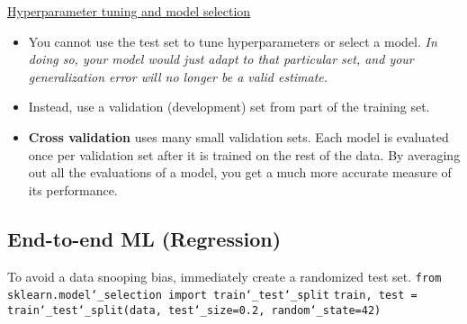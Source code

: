 \vspace{+3.0mm}
\underline{Hyperparameter tuning and model selection}
\begin{itemize}
\vspace{-3.0mm}
\item
You cannot use the test set to tune hyperparameters or select a model.\newline
\textit{In doing so, your model would just adapt to that particular set,
and your generalization error will no longer be a valid estimate.}
\item
Instead, use a validation (development) set from part of the training set.
\item
\textbf{Cross validation} uses many small validation sets.
Each model is evaluated once per validation set after it is trained on the rest of the data.
By averaging out all the evaluations of a model,
you get a much more accurate measure of its performance.
\end{itemize}

\newpage
\subsection{End-to-end ML (Regression)}

To avoid a data snooping bias, immediately create a randomized test set.\newline
\texttt{from sklearn.model\char`_selection import train\char`_test\char`_split}\newline
\texttt{train, test = train\char`_test\char`_split(data, test\char`_size=0.2, random\char`_state=42)}\newline

